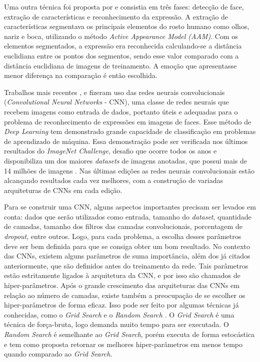 \documentclass[
12pt,       %
openright,      %
oneside,      %
a4paper,      %
english,      %
french,       %
spanish,      %
brazil        %
]{abntex2}
\begin{document}
Uma outra técnica foi proposta por \cite{dhavalikar2014face} e consistia em três fases: detecção de face, extração de características e reconhecimento da expressão. A extração de características segmentava os principais elementos do rosto humano como olhos, nariz e boca, utilizando o método \textit{Active Appearance Model (AAM)}. Com os elementos segmentados, a expressão era reconhecida calculando-se a distância euclidiana entre os pontos dos segmentos, sendo esse valor comparado com a distância euclidiana de imagens de treinamento. A emoção que apresentasse menor diferença na comparação é então escolhida.

Trabalhos mais recentes \cite{levi2015emotion}, \cite{mollahosseini2016going} e \cite{pramerdorfer2016facial} fizeram uso das redes neurais convolucionais (\textit{Convolutional Neural Networks} - CNN), uma classe de redes neurais que recebem imagens como entrada de dados, portanto úteis e adequadas para o problema de reconhecimento de expressões em imagens de faces. Esse método de \textit{Deep Learning} tem demonstrado grande capacidade de classificação em problemas de aprendizado de máquina. Essa demonstração pode ser verificada nos últimos resultados do \textit{ImageNet Challenge}, desafio que ocorre todos os anos e disponibiliza um dos maiores \textit{datasets} de imagens anotadas, que possui mais de 14 milhões de imagens \cite{deng2014scalable}. Nas últimas edições as redes neurais convolucionais estão alcançando resultados cada vez melhores, com a construção de variadas arquiteturas de CNNs em cada edição.

Para se construir uma CNN, alguns aspectos importantes precisam ser levados em conta: dados que serão utilizados como entrada, tamanho do \textit{dataset}, quantidade de camadas, tamanho dos filtros das camadas convolucionais, porcentagem de \textit{dropout}, entre outros. Logo, para cada problema, a escolha desses parâmetros deve ser bem definida para que se consiga obter um bom resultado. No contexto das CNNs, existem alguns parâmetros de suma importância, além dos já citados anteriormente, que são definidos antes do treinamento da rede. Tais parâmetros estão estritamente ligados à arquitetura da CNN, e por isso são chamados de hiper-parâmetros. Após o grande crescimento das arquiteturas das CNNs em relação ao número de camadas, existe também a preocupação de se escolher os hiper-parâmetros de forma eficaz. Isso pode ser feito por algumas técnicas já conhecidas, como o \textit{Grid Search} e o \textit{Random Search} \cite{bergstra2011algorithms}. O \textit{Grid Search} é uma técnica de força-bruta, logo demanda muito tempo para ser executada. O \textit{Random Search} é semelhante ao \textit{Grid Search}, porém executa de forma estocástica e tem como proposta retornar os melhores hiper-parâmetros em menos tempo quando comparado ao \textit{Grid Search}.
\end{document}
